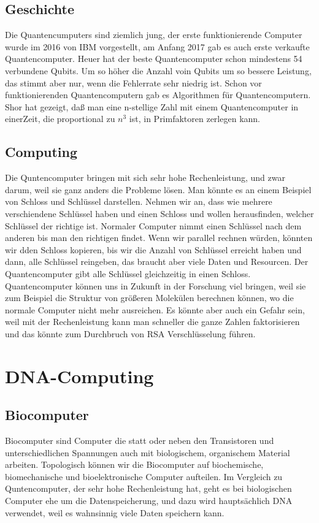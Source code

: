 \documentclass{IEEEcsmag}
\begin{document}
\subsection{Geschichte}
Die Quantencumputers sind ziemlich jung, der erste funktionierende Computer wurde im 2016 von IBM vorgestellt, am Anfang 2017 gab es auch erste verkaufte Quantencomputer. Heuer hat der beste Quantencomputer schon mindestens 54 verbundene Qubits. Um so höher die Anzahl voin Qubits um so bessere Leistung, das stimmt aber nur, wenn die Fehlerrate sehr niedrig ist. Schon vor funktionierenden Quantencomputern gab es Algorithmen für Quantencomputern. Shor hat gezeigt, daß man eine n-stellige Zahl mit einem Quantencomputer in einerZeit, die proportional zu  $n^{3}$ ist, in Primfaktoren zerlegen kann.  \cite{article} 

\subsection{Computing}
Die Quntencomputer bringen mit sich sehr hohe Rechenleistung, und zwar darum, weil sie ganz anders die Probleme lösen. Man könnte es an einem Beispiel von Schloss und Schlüssel darstellen. Nehmen wir an, dass wie mehrere verschiendene Schlüssel haben und einen Schloss und wollen herausfinden, welcher Schlüssel der richtige ist. Normaler Computer nimmt einen Schlüssel nach dem anderen bis man den richtigen findet. Wenn wir parallel rechnen würden, könnten wir dden Schloss kopieren, bis wir die Anzahl von Schlüssel erreicht haben und dann, alle Schlüssel reingeben, das braucht aber viele Daten und Resourcen. Der Quantencomputer gibt alle Schlüssel gleichzeitig in einen Schloss. Quantencomputer können uns in Zukunft in der Forschung viel bringen, weil sie zum Beispiel die Struktur von größeren Molekülen berechnen können, wo die normale Computer nicht mehr ausreichen. Es könnte aber auch ein Gefahr sein, weil mit der Rechenleistung kann man schneller die ganze Zahlen faktorisieren und das könnte zum Durchbruch von RSA Verschlüsselung führen. \cite{book}

\section{DNA-Computing}

\subsection{Biocomputer}
Biocomputer sind Computer die statt oder neben den Transistoren und unterschiedlichen Spannungen auch mit biologischem, organischem Material arbeiten. Topologisch können wir die Biocomputer auf biochemische, biomechanische und bioelektronische Computer aufteilen. Im Vergleich zu Quntencomputer, der sehr hohe Rechenleistung hat, geht es bei biologischen Computer ehe um die Datenspeicherung, und dazu wird hauptsächlich DNA verwendet, weil es wahnsinnig viele Daten speichern kann. 
\end{document}
